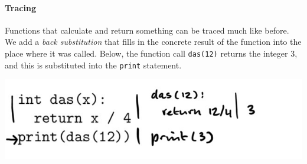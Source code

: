%
%
%

%

\paragraph{Tracing}

Functions that calculate and return something can be traced much like before. We add a \emph{back substitution} that fills in the concrete result of the function into the place where it was called. Below, the function call \texttt{das(12)} returns the integer 3, and this is substituted into the \texttt{print} statement.

\includegraphics[width=.7\textwidth]{6-trace-returns.jpeg}
